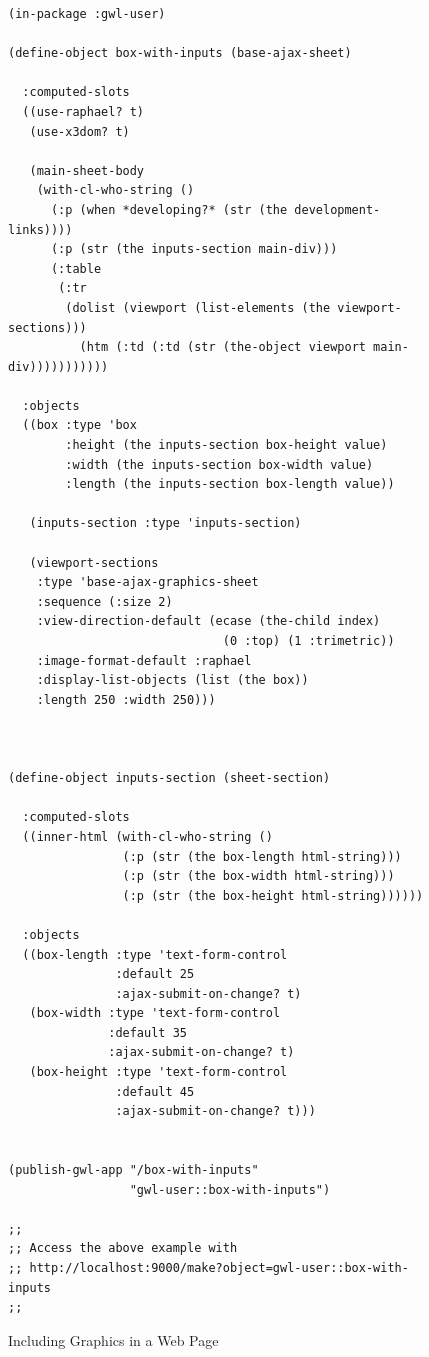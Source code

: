 \documentclass [11pt]{book}
\begin{document}
\begin{figure}
\begin{lrbox}{\boxedverb}
\begin{minipage}{\linewidth}
{\small

\begin{verbatim}(in-package :gwl-user)

(define-object box-with-inputs (base-ajax-sheet)
  
  :computed-slots
  ((use-raphael? t)
   (use-x3dom? t)
   
   (main-sheet-body 
    (with-cl-who-string ()
      (:p (when *developing?* (str (the development-links))))
      (:p (str (the inputs-section main-div)))
      (:table
       (:tr
        (dolist (viewport (list-elements (the viewport-sections)))
          (htm (:td (:td (str (the-object viewport main-div)))))))))))
  
  :objects
  ((box :type 'box
        :height (the inputs-section box-height value)
        :width (the inputs-section box-width value)
        :length (the inputs-section box-length value))
   
   (inputs-section :type 'inputs-section)

   (viewport-sections
    :type 'base-ajax-graphics-sheet
    :sequence (:size 2)
    :view-direction-default (ecase (the-child index)
                              (0 :top) (1 :trimetric))
    :image-format-default :raphael
    :display-list-objects (list (the box))
    :length 250 :width 250)))
  

 
(define-object inputs-section (sheet-section)
  
  :computed-slots
  ((inner-html (with-cl-who-string ()
                (:p (str (the box-length html-string)))
                (:p (str (the box-width html-string)))
                (:p (str (the box-height html-string))))))

  :objects 
  ((box-length :type 'text-form-control
               :default 25
               :ajax-submit-on-change? t)
   (box-width :type 'text-form-control
              :default 35
              :ajax-submit-on-change? t)
   (box-height :type 'text-form-control
               :default 45
               :ajax-submit-on-change? t)))


(publish-gwl-app "/box-with-inputs" 
                 "gwl-user::box-with-inputs")

;;
;; Access the above example with 
;; http://localhost:9000/make?object=gwl-user::box-with-inputs
;;

\end{verbatim}}
\end{minipage}
\end{lrbox}
\fbox{\usebox{\boxedverb}}

\caption{Including Graphics in a Web Page}

\label{fig:gwl-5}

\end{figure}
\end{document}
